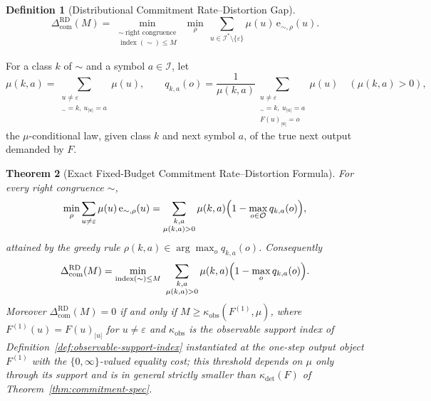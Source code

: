 \documentclass[12pt]{article}
\newtheorem{theorem}{Theorem}[section]
\theoremstyle{definition}
\newtheorem{definition}[theorem]{Definition}
\newcommand{\ComRD}{\Delta_{\mathrm{com}}^{\mathrm{RD}}}
\begin{document}
\begin{definition}[Distributional Commitment Rate--Distortion Gap]
\label{def:com-rd-gap}
\[
\ComRD(M)
=
\min_{\substack{\sim\ \text{right congruence}\\ \operatorname{index}(\sim)\le M}}
\ \min_{\rho}
\ \sum_{u\in\mathcal I^*\setminus\{\varepsilon\}}
\mu(u)\,
\mathrm e_{\sim,\rho}(u).
\]
\end{definition}

For a class $k$ of $\sim$ and a symbol $a\in\mathcal I$, let
\[
\mu(k,a)
=
\sum_{\substack{u\ne\varepsilon\\ [u_{1:|u|-1}]_\sim=k,\ u_{|u|}=a}}
\mu(u),
\qquad
q_{k,a}(o)
=
\frac1{\mu(k,a)}
\sum_{\substack{u\ne\varepsilon\\ [u_{1:|u|-1}]_\sim=k,\ u_{|u|}=a\\ F(u)_{|u|}=o}}
\mu(u)
\quad(\mu(k,a)>0),
\]
the $\mu$-conditional law, given class $k$ and next symbol $a$, of the true
next output demanded by $F$.

\begin{theorem}[Exact Fixed-Budget Commitment Rate--Distortion Formula]
\label{thm:com-rd-formula}
For every right congruence $\sim$,
\[
\min_\rho
\sum_{u\ne\varepsilon}
\mu(u)\,\mathrm e_{\sim,\rho}(u)
=
\sum_{\substack{k,a\\ \mu(k,a)>0}}
\mu(k,a)
\Bigl(1-\max_{o\in\mathcal O}q_{k,a}(o)\Bigr),
\]
attained by the greedy rule $\rho(k,a)\in\arg\max_oq_{k,a}(o)$.  Consequently
\[
\ComRD(M)
=
\min_{\operatorname{index}(\sim)\le M}
\ \sum_{\substack{k,a\\ \mu(k,a)>0}}
\mu(k,a)
\Bigl(1-\max_{o}q_{k,a}(o)\Bigr).
\]
Moreover $\ComRD(M)=0$ if and only if $M\ge\kappa_{\mathrm{obs}}(F^{(1)},\mu)$,
where $F^{(1)}(u)=F(u)_{|u|}$ for $u\ne\varepsilon$ and
$\kappa_{\mathrm{obs}}$ is the observable support index of
Definition~\ref{def:observable-support-index} instantiated at the one-step
output object $F^{(1)}$ with the $\{0,\infty\}$-valued equality cost; this
threshold depends on $\mu$ only through its support and is in general
strictly smaller than $\kappa_{\det}(F)$ of Theorem~\ref{thm:commitment-spec}.
\end{theorem}
\end{document}
